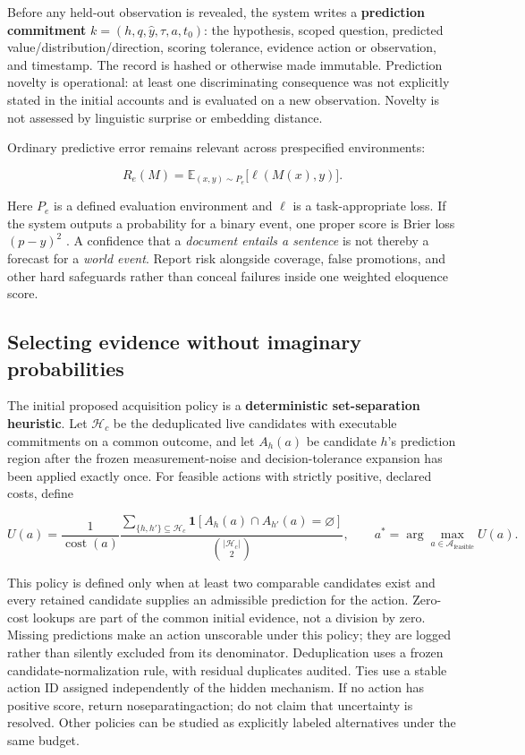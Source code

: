 \documentclass[11pt,a4paper]{article}
\newcommand{\CNSIdentifier}[1]{{\small\ttfamily\def\_{\textunderscore\allowbreak}#1}}
\begin{document}
Before any held-out observation is revealed, the system writes a
\textbf{prediction commitment} \(k=(h,q,\hat y,\tau,a,t_0)\): the
hypothesis, scoped question, predicted value/distribution/direction,
scoring tolerance, evidence action or observation, and timestamp. The
record is hashed or otherwise made immutable. Prediction novelty is
operational: at least one discriminating consequence was not explicitly
stated in the initial accounts and is evaluated on a new observation.
Novelty is not assessed by linguistic surprise or embedding distance.

Ordinary predictive error remains relevant across prespecified
environments:

\[
R_e(M)=\mathbb{E}_{(x,y)\sim P_e}\big[\ell(M(x),y)\big].
\]

Here \(P_e\) is a defined evaluation environment and \(\ell\) is a
task-appropriate loss. If the system outputs a probability for a binary
event, one proper score is Brier loss \((p-y)^2\) \citep{R22}. A
confidence that a \emph{document entails a sentence} is not thereby a
forecast for a \emph{world event}. Report risk alongside coverage, false
promotions, and other hard safeguards rather than conceal failures
inside one weighted eloquence score.

\subsection{Selecting evidence without imaginary
probabilities}\label{selecting-evidence-without-imaginary-probabilities}

The initial proposed acquisition policy is a \textbf{deterministic
set-separation heuristic}. Let \(\mathcal H_c\) be the deduplicated live
candidates with executable commitments on a common outcome, and let
\(A_h(a)\) be candidate \(h\)'s prediction region after the frozen
measurement-noise and decision-tolerance expansion has been applied
exactly once. For feasible actions with strictly positive, declared
costs, define

\[
U(a)=\frac{1}{\operatorname{cost}(a)}
\frac{\displaystyle\sum_{\{h,h'\}\subseteq\mathcal H_c}
\mathbf 1\!\left[A_h(a)\cap A_{h'}(a)=\varnothing\right]}
{\displaystyle\binom{|\mathcal H_c|}{2}},
\qquad a^*=\arg\max_{a\in\mathcal A_{\mathrm{feasible}}}U(a).
\]

This policy is defined only when at least two comparable candidates
exist and every retained candidate supplies an admissible prediction for
the action. Zero-cost lookups are part of the common initial evidence,
not a division by zero. Missing predictions make an action unscorable
under this policy; they are logged rather than silently excluded from
its denominator. Deduplication uses a frozen candidate-normalization
rule, with residual duplicates audited. Ties use a stable action ID
assigned independently of the hidden mechanism. If no action has
positive score, return \CNSIdentifier{no\_separating\_action}; do not claim
that uncertainty is resolved. Other policies can be studied as
explicitly labeled alternatives under the same budget.
\end{document}
